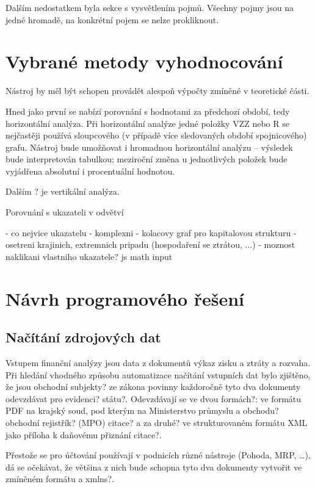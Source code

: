 Dalším nedostatkem byla sekce s vysvětlením pojmů. Všechny pojmy jsou na jedné hromadě, na konkrétní pojem se nelze prokliknout.



\section{Vybrané metody vyhodnocování}
Nástroj by měl být schopen provádět alespoň výpočty zmíněné v teoretické části.

Hned jako první se nabízí porovnání s hodnotami za předchozí období, tedy horizontální analýza. Při horizontální analýze jedné položky VZZ nebo R se nejčastěji používá sloupcového (v případě více sledovaných období spojnicového) grafu. Nástroj bude umožňovat i hromadnou horizontální analýzu -- výsledek bude interpretován tabulkou; meziroční změna u jednotlivých položek bude vyjádřena absolutní i procentuální hodnotou. 

Dalším ? je vertikální analýza.


Porovnání s ukazateli v odvětví

- co nejvice ukazatelu - komplexni
- kolacovy graf pro kapitalovou strukturu
- osetreni krajinich, extremnich pripadu (hospodaření se ztrátou, ...)
- moznost naklikani vlastniho ukazatele? js math input



\section{Návrh programového řešení}
\subsection{Načítání zdrojových dat}
Vstupem finanční analýzy jsou data z dokumentů výkaz zisku a ztráty a rozvaha. Při hledání vhodného způsobu automatizace načítání vstupních dat bylo zjištěno, že jsou obchodní subjekty? ze zákona povinny každoročně tyto dva dokumenty odevzdávat pro evidenci? státu?. Odevzdávají se ve dvou formách?: ve formátu PDF na krajský soud, pod kterým na Ministerstvo průmyslu a obchodu? obchodní rejistřík? (MPO) citace? a za druhé? ve strukturovaném formátu XML jako příloha k daňovému přiznání citace?.

Přestože se pro účtování používají v podnicích různé nástroje (Pohoda, MRP, \dots), dá se očekávat, že většina z nich bude schopna tyto dva dokumenty vytvořit ve zmíněném formátu a xmlns?.

